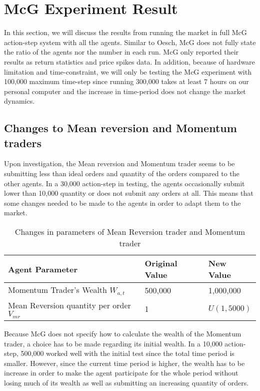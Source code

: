 \section{McG Experiment Result} 
In this section, we will discuss the results from running the market in full McG action-step system with all the agents. Similar to Oesch, McG does not fully state the ratio of the agents nor the number in each run. McG only reported their results as return statistics and price spikes data. In addition, because of hardware limitation and time-constraint, we will only be testing the McG experiment with 100,000 maximum time-step since running 300,000 takes at least 7 hours on our personal computer and the increase in time-period does not change the market dynamics. 

\subsection{Changes to Mean reversion and Momentum traders}
Upon investigation, the Mean reversion and Momentum trader seems to be submitting less than ideal orders and quantity of the orders compared to the other agents. In a 30,000 action-step in testing, the agents occasionally submit lower than 10,000 quantity or does not submit any orders at all. This means that some changes needed to be made to the agents in order to adapt them to the market. 

\begin{table}[h]
\centering
\begin{tabular}{ |m||p{4cm}|p{4cm}|} 
\hline
\textbf{Agent Parameter}& \textbf{ Original Value } & \textbf{New Value} \\
\hline
\hline
Momentum Trader's Wealth $W_{a,t}$ & 500,000 & 1,000,000  \\ 
\hline
Mean Reversion quantity per order $V_{mr}$ & 1 & $U(1, 5000)$ \\ 
\hline
\end{tabular}
\label{Tab:C5_parameters}
\caption{Changes in parameters of Mean Reversion trader and Momentum trader}  
\end{table}
\FloatBarrier

Because McG does not specify how to calculate the wealth of the Momentum trader, a choice has to be made regarding its initial wealth. In a 10,000 action-step, 500,000 worked well with the initial test since the total time period is smaller. However, since the current time period is higher, the wealth has to be increase in order to make the agent participate for the whole period without losing much of its wealth as well as submitting an increasing quantity of orders. 

